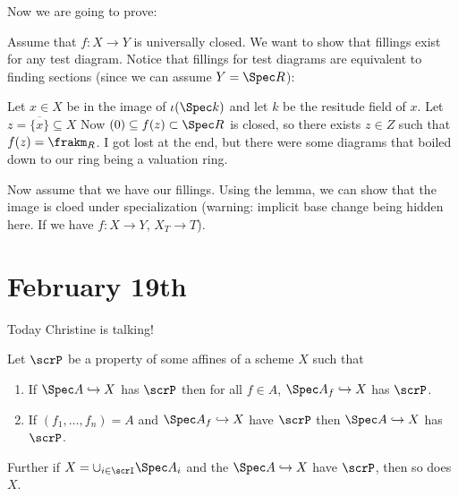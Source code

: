 \documentclass[12pt]{article}
\begin{document}
Now we are going to prove:
\begin{prf}
	Assume that $f:X\to Y$ is universally closed. We want to show that fillings exist for any test diagram. Notice that fillings for test diagrams are equivalent 
	to finding sections (since we can assume $Y=\Spec R$):
	\begin{figure}[h]
		\centering
	\end{figure}
	Let $x\in X$ be in the image of $\iota(\Spec k)$ and let $k$ be the resitude field of $x$. Let $z=\overline{\{x\}}\subseteq X$
	Now $(0)\subseteq f(z)\subset\Spec R$ is closed, so there exists $z\in Z$ such that $f(z)=\frakm_R$. I got lost at the end, but there were some diagrams that 
	boiled down to our ring being a valuation ring.

	Now assume that we have our fillings. Using the lemma, we can show that the image is cloed under specialization (warning: implicit base change being hidden here. If 
	we have $f:X\to Y$, $X_T\to T$).
\end{prf}

\section{February 19th}
Today Christine is talking!
\begin{lem}
	Let $\scrP$ be a property of some affines of a scheme $X$ such that
	\begin{enumerate}
		\item If $\Spec A\hookrightarrow X$ has $\scrP$ then for all $f\in A$, $\Spec A_f\hookrightarrow X$ has $\scrP$.
		\item If $(f_1,\dots,f_n)=A$ and $\Spec A_f\hookrightarrow X$ have $\scrP$ then $\Spec A\hookrightarrow X$ has $\scrP$.
	\end{enumerate}
	Further if $X=\cup_{i\in\scrI}\Spec A_i$ and the $\Spec A\hookrightarrow X$ have $\scrP$, then so does $X$.
\end{lem}
\end{document}
